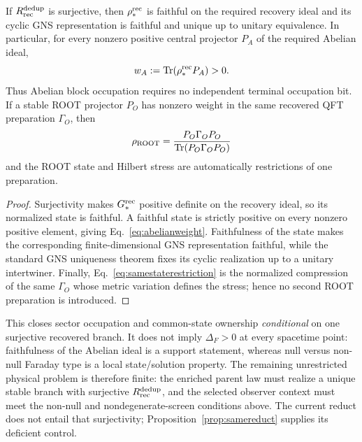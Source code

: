 \begin{proposition}
\label{prop:faithfuloccupation}
If $R_{\rm rec}^{\rm dedup}$ is surjective, then
$\rho_*^{\rm rec}$ is faithful on the required recovery ideal and its cyclic
GNS representation is faithful and unique up to unitary equivalence.
In particular, for
every nonzero positive central projector $P_A$ of the required Abelian ideal,
\begin{equation}
w_A:=\operatorname{Tr}(\rho_*^{\rm rec}P_A)>0.
\label{eq:abelianweight}
\end{equation}
Thus Abelian block occupation requires no independent terminal occupation
bit.  If a stable ROOT projector $P_O$ has nonzero weight in the same
recovered QFT preparation $\Gamma_O$, then
\begin{equation}
\rho_{\rm ROOT}
=\frac{P_O\Gamma_OP_O}{\operatorname{Tr}(P_O\Gamma_OP_O)}
\label{eq:samestaterestriction}
\end{equation}
and the ROOT state and Hilbert stress are automatically restrictions of one
preparation.
\end{proposition}

\begin{proof}
Surjectivity makes $G_*^{\rm rec}$ positive definite on the recovery ideal,
so its normalized state is faithful.  A faithful state is strictly positive
on every nonzero positive element, giving Eq.~\eqref{eq:abelianweight}.
Faithfulness of the state makes the corresponding finite-dimensional GNS
representation faithful, while the standard GNS uniqueness theorem fixes its
cyclic realization up to a unitary intertwiner.  Finally,
Eq.~\eqref{eq:samestaterestriction} is the normalized compression of the same
$\Gamma_O$ whose metric variation defines the stress; hence no second ROOT
preparation is introduced.
\end{proof}

This closes sector occupation and common-state ownership \emph{conditional}
on one surjective recovered branch.  It does not imply
$\Delta_F>0$ at every spacetime point: faithfulness of the Abelian ideal is a
support statement, whereas null versus non-null Faraday type is a local
state/solution property.  The remaining unrestricted physical problem is
therefore finite: the enriched parent law must realize a unique stable branch with
surjective $R_{\rm rec}^{\rm dedup}$, and the selected observer context must
meet the non-null and nondegenerate-screen conditions above.  The current
reduct does not entail that surjectivity; Proposition~\ref{prop:samereduct}
supplies its deficient control.


